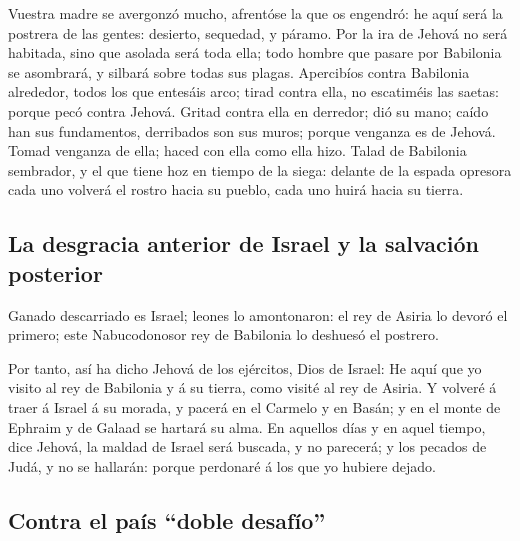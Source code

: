Vuestra madre se avergonzó mucho, afrentóse la que os engendró: he aquí
será la postrera de las gentes: desierto, sequedad, y páramo.
 Por la ira de Jehová no será habitada, sino que asolada
será toda ella; todo hombre que pasare por Babilonia se asombrará, y
silbará sobre todas sus plagas.  Apercibíos contra
Babilonia alrededor, todos los que entesáis arco; tirad contra ella, no
escatiméis las saetas: porque pecó contra Jehová.  Gritad
contra ella en derredor; dió su mano; caído han sus fundamentos,
derribados son sus muros; porque venganza es de Jehová. Tomad venganza
de ella; haced con ella como ella hizo.  Talad de
Babilonia sembrador, y el que tiene hoz en tiempo de la siega: delante
de la espada opresora cada uno volverá el rostro hacia su pueblo, cada
uno huirá hacia su tierra.

\hypertarget{la-desgracia-anterior-de-israel-y-la-salvaciuxf3n-posterior}{%
\subsection{La desgracia anterior de Israel y la salvación
posterior}\label{la-desgracia-anterior-de-israel-y-la-salvaciuxf3n-posterior}}

 Ganado descarriado es Israel; leones lo amontonaron: el
rey de Asiria lo devoró el primero; este Nabucodonosor rey de Babilonia
lo deshuesó el postrero.

 Por tanto, así ha dicho Jehová de los ejércitos, Dios de
Israel: He aquí que yo visito al rey de Babilonia y á su tierra, como
visité al rey de Asiria.  Y volveré á traer á Israel á su
morada, y pacerá en el Carmelo y en Basán; y en el monte de Ephraim y de
Galaad se hartará su alma.  En aquellos días y en aquel
tiempo, dice Jehová, la maldad de Israel será buscada, y no parecerá; y
los pecados de Judá, y no se hallarán: porque perdonaré á los que yo
hubiere dejado.

\hypertarget{contra-el-pauxeds-doble-desafuxedo}{%
\subsection{Contra el país ``doble
desafío''}\label{contra-el-pauxeds-doble-desafuxedo}}

